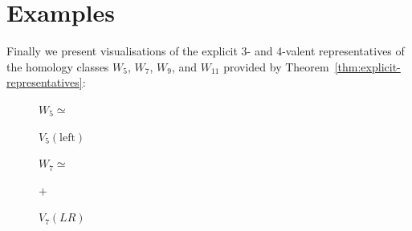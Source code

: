 \documentclass[11pt]{article}
\theoremstyle{definition}
\theoremstyle{plain}
\newcommand{\LeftChoice}{\mathrm{left}}
\begin{document}
\section{Examples}
Finally we present visualisations of the explicit $3$- and $4$-valent representatives of the homology classes $W_5$, $W_7$, $W_9$, and $W_{11}$ provided by Theorem~\ref{thm:explicit-representatives}:

\begin{figure}[H]
\centering
\begin{minipage}{0.18\linewidth}
\centering
$W_5 \simeq$
\end{minipage}
\begin{minipage}{0.24\linewidth}
\centering
\resizebox{0.9\linewidth}{!}{}
\caption*{$V_5(\LeftChoice)$}
\end{minipage}
\end{figure}

\begin{figure}[H]
\centering
\begin{minipage}{0.16\linewidth}
\centering
$W_7 \simeq$
\end{minipage}
\begin{minipage}{0.22\linewidth}
\centering
\resizebox{0.9\linewidth}{!}{}
\caption*{$V_7(LL)$}
\end{minipage}
\begin{minipage}{0.035\linewidth}
\centering
$+$
\end{minipage}
\begin{minipage}{0.22\linewidth}
\centering
\resizebox{0.9\linewidth}{!}{}
\caption*{$V_7(LR)$}
\end{minipage}
\end{figure}

\vspace{-1.0em}
\end{document}
